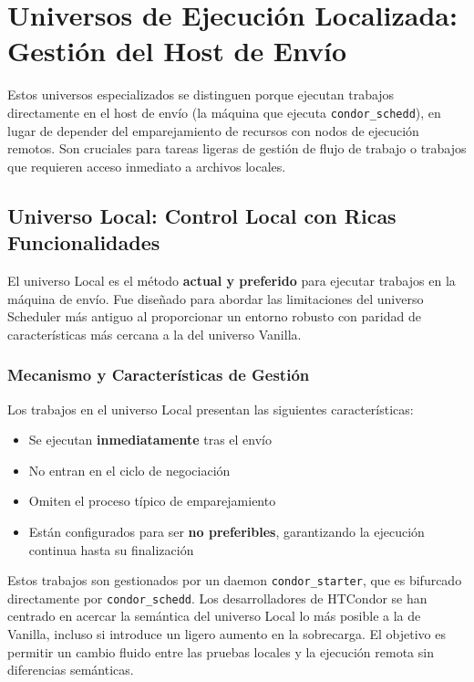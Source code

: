\section{Universos de Ejecución Localizada: Gestión del Host de Envío}

Estos universos especializados se distinguen porque ejecutan trabajos directamente en el host de envío (la máquina que ejecuta \texttt{condor\_schedd}), en lugar de depender del emparejamiento de recursos con nodos de ejecución remotos. Son cruciales para tareas ligeras de gestión de flujo de trabajo o trabajos que requieren acceso inmediato a archivos locales.

\subsection{Universo Local: Control Local con Ricas Funcionalidades}

El universo Local es el método \textbf{actual y preferido} para ejecutar trabajos en la máquina de envío. Fue diseñado para abordar las limitaciones del universo Scheduler más antiguo al proporcionar un entorno robusto con paridad de características más cercana a la del universo Vanilla.

\subsubsection{Mecanismo y Características de Gestión}

Los trabajos en el universo Local presentan las siguientes características:

\begin{itemize}
	\item Se ejecutan \textbf{inmediatamente} tras el envío
	\item No entran en el ciclo de negociación
	\item Omiten el proceso típico de emparejamiento
	\item Están configurados para ser \textbf{no preferibles}, garantizando la ejecución continua hasta su finalización
\end{itemize}

Estos trabajos son gestionados por un daemon \texttt{condor\_starter}, que es bifurcado directamente por \texttt{condor\_schedd}. Los desarrolladores de HTCondor se han centrado en acercar la semántica del universo Local lo más posible a la de Vanilla, incluso si introduce un ligero aumento en la sobrecarga. El objetivo es permitir un cambio fluido entre las pruebas locales y la ejecución remota sin diferencias semánticas.

